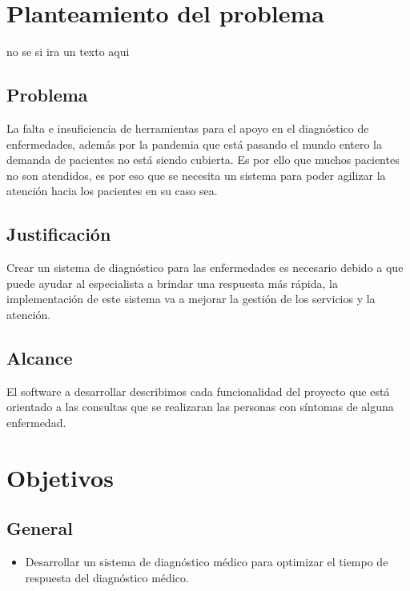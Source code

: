 \documentclass[preprint,12pt]{elsarticle}
\begin{document}
\section{Planteamiento del problema}
no se si ira un texto aqui

	\subsection{\textbf{Problema}}
 La falta e insuficiencia de herramientas para el apoyo en el diagnóstico de enfermedades, además por la pandemia que está pasando el mundo entero la demanda de pacientes no está siendo cubierta. Es por ello que muchos pacientes no son atendidos, es por eso que se necesita un sistema para poder agilizar la atención hacia los pacientes en su caso sea.
	\subsection{\textbf{Justificación }}
Crear un sistema de diagnóstico para las enfermedades es necesario debido a que puede ayudar al especialista a brindar una respuesta más rápida, la implementación de este sistema va a mejorar la gestión de los servicios y la atención.

	\subsection{\textbf{ Alcance }}
El software a desarrollar describimos cada funcionalidad del proyecto que está orientado a las consultas que se realizaran las personas con síntomas de alguna enfermedad.

\section{Objetivos}
		\subsection{\textbf{ General }}
	 \begin{itemize}
		\item Desarrollar un sistema de diagnóstico médico para optimizar el tiempo  de respuesta del diagnóstico médico.
	 \end{itemize}
\end{document}
